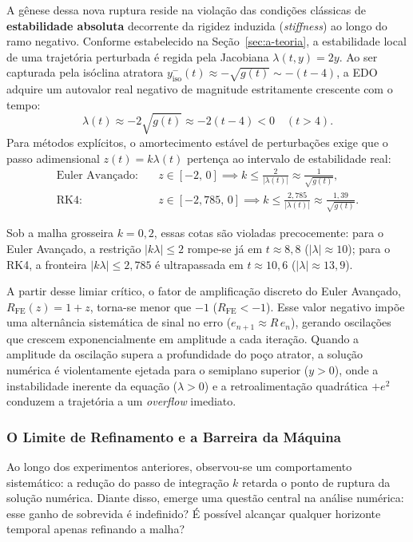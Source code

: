 \documentclass[12pt, a4paper]{article}
\begin{document}
A gênese dessa nova ruptura reside na violação das condições clássicas de
\textbf{estabilidade absoluta} decorrente da rigidez induzida (\emph{stiffness})
ao longo do ramo negativo. Conforme estabelecido na Seção~\ref{sec:a-teoria},
a estabilidade local de uma trajetória perturbada é regida pela Jacobiana
$\lambda(t, y) = 2y$. Ao ser capturada pela isóclina atratora
$y_{\text{iso}}^{-}(t) \approx -\sqrt{g(t)} \sim -(t - 4)$, a EDO adquire um
autovalor real negativo de magnitude estritamente crescente com o tempo:
\begin{equation}\label{eq:lambda-stiff}
  \lambda(t) \approx -2\sqrt{g(t)} \approx -2(t - 4) < 0 \quad (t > 4).
\end{equation}
Para métodos explícitos, o amortecimento estável de perturbações exige que o passo
adimensional $z(t) = k\lambda(t)$ pertença ao intervalo de estabilidade real:
\begin{align}
  \text{Euler Avançado:}\quad & z \in [-2,\, 0] \implies k \le \frac{2}{|\lambda(t)|} \approx \frac{1}{\sqrt{g(t)}}, \label{eq:estat-fe} \\
  \text{RK4:}\quad            & z \in [-2{,}785,\, 0] \implies k \le \frac{2{,}785}{|\lambda(t)|} \approx \frac{1{,}39}{\sqrt{g(t)}}. \label{eq:estat-rk4}
\end{align}

Sob a malha grosseira $k = 0{,}2$, essas cotas são violadas precocemente:
para o Euler Avançado, a restrição $|k\lambda| \le 2$ rompe-se já em $t \approx 8{,}8$
($|\lambda| \approx 10$); para o RK4, a fronteira $|k\lambda| \le 2{,}785$ é
ultrapassada em $t \approx 10{,}6$ ($|\lambda| \approx 13{,}9$).

A partir desse limiar crítico, o fator de amplificação discreto do Euler Avançado,
$R_{\text{FE}}(z) = 1 + z$, torna-se menor que $-1$ ($R_{\text{FE}} < -1$). Esse valor
negativo impõe uma alternância sistemática de sinal no erro ($e_{n+1} \approx R\,e_n$),
gerando oscilações que crescem exponencialmente em amplitude a cada iteração.
Quando a amplitude da oscilação supera a profundidade do poço atrator, a solução
numérica é violentamente ejetada para o semiplano superior ($y > 0$), onde a
instabilidade inerente da equação ($\lambda > 0$) e a retroalimentação quadrática
$+e^2$ conduzem a trajetória a um \emph{overflow} imediato.

\subsubsection{O Limite de Refinamento e a Barreira da Máquina}
\label{sec:d-limite-refinamento}
Ao longo dos experimentos anteriores, observou-se um comportamento sistemático: a redução do passo de integração $k$ retarda o ponto de ruptura da solução numérica. Diante disso, emerge uma questão central na análise numérica: esse ganho de sobrevida é indefinido? É possível alcançar qualquer horizonte temporal apenas refinando a malha?
\end{document}

